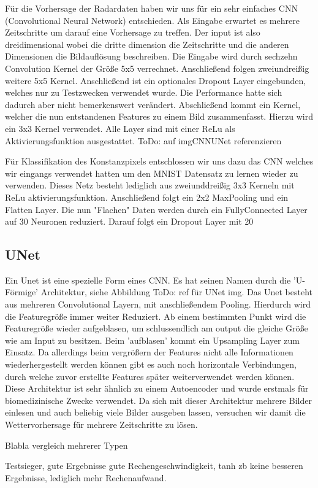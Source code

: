 Für die Vorhersage der Radardaten haben wir uns für ein sehr einfaches CNN (Convolutional Neural Network) entschieden.
Als Eingabe erwartet es mehrere Zeitschritte um darauf eine Vorhersage zu treffen. Der input ist also dreidimensional wobei die dritte dimension die Zeitschritte und die anderen Dimensionen die Bildauflösung beschreiben. Die Eingabe wird durch sechzehn Convolution Kernel der Größe 5x5 verrechnet. Anschließend folgen zweiundreißig weitere 5x5 Kernel. Anschließend ist ein optionales Dropout Layer eingebunden, welches nur zu Testzwecken verwendet wurde. Die Performance hatte sich dadurch aber nicht bemerkenswert verändert. Abschließend kommt ein Kernel, welcher die nun entstandenen Features zu einem Bild zusammenfasst. Hierzu wird ein 3x3 Kernel verwendet. Alle Layer sind mit einer ReLu als Aktivierungsfunktion ausgestattet.
ToDo: auf imgCNNUNet referenzieren

Für Klassifikation des Konstanzpixels entschlossen wir uns dazu das CNN welches wir eingangs verwendet hatten um den MNIST Datensatz zu lernen wieder zu verwenden. Dieses Netz besteht lediglich aus zweiunddreißig 3x3 Kerneln mit ReLu aktivierungsfunktion. Anschließend folgt ein 2x2 MaxPooling und ein Flatten Layer. Die nun "Flachen" Daten werden durch ein FullyConnected Layer auf 30 Neuronen reduziert. Darauf folgt ein Dropout Layer mit 20%

\subsection{UNet}
\label{kapitelUNet}
Ein Unet ist eine spezielle Form eines CNN. Es hat seinen Namen durch die 'U-Förmige' Architektur, siehe Abbildung
ToDo: ref für UNet img.
Das Unet besteht aus mehreren Convolutional Layern, mit anschließendem Pooling. Hierdurch wird die Featuregröße immer weiter Reduziert. Ab einem bestimmten Punkt wird die Featuregröße wieder aufgeblasen, um schlussendlich am output die gleiche Größe wie am Input zu besitzen. Beim 'aufblasen' kommt ein Upsampling Layer zum Einsatz. Da allerdings beim vergrößern der Features nicht alle Informationen wiederhergestellt werden können gibt es auch noch horizontale Verbindungen, durch welche zuvor erstellte Features später weiterverwendet werden können.
Diese Architektur ist sehr ähnlich zu einem Autoencoder und wurde erstmals für biomedizinische Zwecke verwendet. Da sich mit dieser Architektur mehrere Bilder einlesen und auch beliebig viele Bilder ausgeben lassen, versuchen wir damit die Wettervorhersage für mehrere Zeitschritte zu lösen.

Blabla vergleich mehrerer Typen

Testsieger, gute Ergebnisse gute Rechengeschwindigkeit, tanh zb keine besseren Ergebnisse, lediglich mehr Rechenaufwand.



